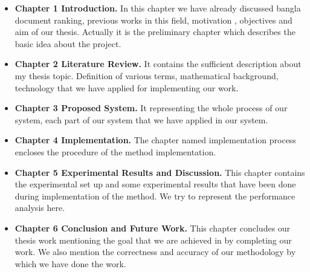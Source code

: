 \begin{itemize}

\item \textbf{Chapter 1 Introduction.} In this chapter we have already discussed bangla document ranking, previous works in this field, motivation , objectives and aim of our thesis. Actually it is the preliminary chapter which describes the basic idea about the project. 

\item \textbf{Chapter 2 Literature Review.} It contains the sufficient description about my thesis topic. Definition of various terms, mathematical background, technology that we have applied for implementing our work. 

\item \textbf{Chapter 3 Proposed System.} It representing the whole process of our system, each part of our system that we have applied in our system.  

\item \textbf{Chapter 4 Implementation.} The chapter named implementation process encloses  the  procedure  of  the  method  implementation.

\item \textbf{Chapter 5 Experimental Results and Discussion.} This chapter contains the experimental set up and some experimental results that have been done during implementation of the method. We try to represent the performance analysis here.

\item \textbf{Chapter 6 Conclusion and Future Work.} This chapter concludes our thesis work mentioning the goal that we are achieved in by completing our work. We also mention the correctness and accuracy of our methodology by which we have done the work.

\end{itemize} 
%
